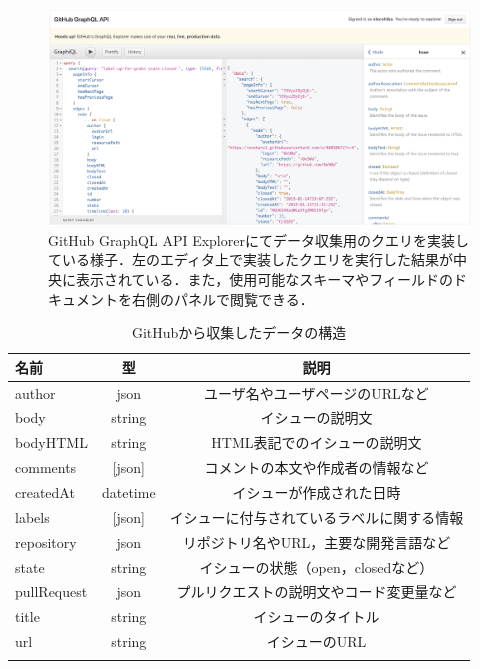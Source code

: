 

\begin{figure}[tb]
    \centering
    \includegraphics[width=1.0\columnwidth]{GitHub_api_explorer.png}
    \caption{GitHub GraphQL API Explorerにてデータ収集用のクエリを実装している様子．左のエディタ上で実装したクエリを実行した結果が中央に表示されている．また，使用可能なスキーマやフィールドのドキュメントを右側のパネルで閲覧できる．}
    \label{fig:GitHub_api_explorer}
\end{figure}


\begin{table}[t]

  \centering
  \caption{GitHubから収集したデータの構造}
  \label{table:format_collected_GH_data}
    
  \begin{tabular}{l | c | c } \Xhline{3\arrayrulewidth}
      名前 & 型 & 説明 \\ \hline \hline
      author & json & ユーザ名やユーザページのURLなど\\
      body & string & イシューの説明文  \\
      bodyHTML & string & HTML表記でのイシューの説明文 \\
      comments & [json] & コメントの本文や作成者の情報など \\
      createdAt & datetime & イシューが作成された日時 \\
      labels & [json] & イシューに付与されているラベルに関する情報 \\
      repository & json & リポジトリ名やURL，主要な開発言語など\\  
      state & string & イシューの状態（open，closedなど） \\
      pullRequest & json & プルリクエストの説明文やコード変更量など \\
      title & string & イシューのタイトル \\
      url & string & イシューのURL \\
      
      \Xhline{3\arrayrulewidth}
  \end{tabular}
\end{table}

